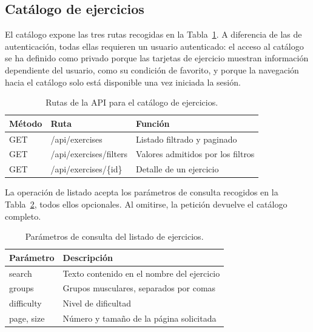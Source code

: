 \documentclass[12pt,a4paper,twoside,openright]{book}
\begin{document}
    \subsection{Catálogo de ejercicios}
    \label{sec:api-catalogo}

    El catálogo expone las tres rutas recogidas en la
    Tabla~\ref{tab:api-catalogo}. A diferencia de las de autenticación, todas
    ellas requieren un usuario autenticado: el acceso al catálogo se ha
    definido como privado porque las tarjetas de ejercicio muestran
    información dependiente del usuario, como su condición de favorito, y
    porque la navegación hacia el catálogo solo está disponible una vez
    iniciada la sesión.

    \begin{table}[htbp]
        \centering
        \begin{tabular}{lll}
            \toprule
            \textbf{Método} & \textbf{Ruta} & \textbf{Función} \\
            \midrule
            GET & /api/exercises          & Listado filtrado y paginado \\
            GET & /api/exercises/filters  & Valores admitidos por los filtros \\
            GET & /api/exercises/\{id\}   & Detalle de un ejercicio \\
            \bottomrule
        \end{tabular}
        \caption{Rutas de la API para el catálogo de ejercicios.}
        \label{tab:api-catalogo}
    \end{table}

        La operación de listado acepta los parámetros de consulta recogidos en la
    Tabla~\ref{tab:api-catalogo-params}, todos ellos opcionales. Al omitirse,
    la petición devuelve el catálogo completo.

    \begin{table}[htbp]
        \centering
        \begin{tabular}{l p{8cm}}
            \toprule
            \textbf{Parámetro} & \textbf{Descripción} \\
            \midrule
            search     & Texto contenido en el nombre del ejercicio \\
            groups     & Grupos musculares, separados por comas \\
            difficulty & Nivel de dificultad \\
            page, size & Número y tamaño de la página solicitada \\
            \bottomrule
        \end{tabular}
        \caption{Parámetros de consulta del listado de ejercicios.}
        \label{tab:api-catalogo-params}
    \end{table}
\end{document}
